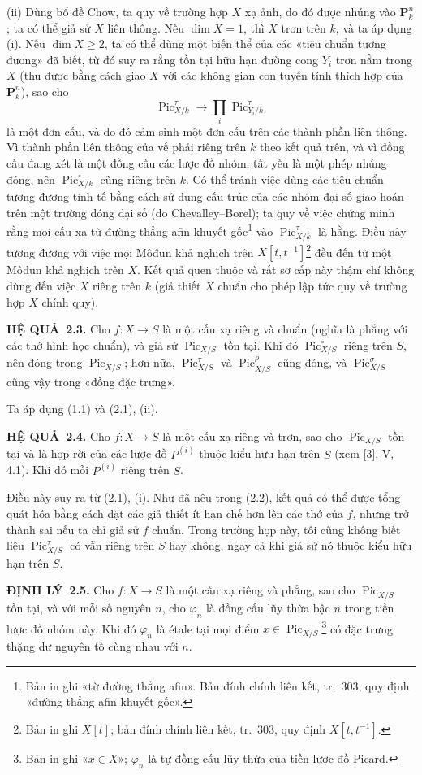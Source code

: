 \documentclass[11pt,twoside,openany]{book}
\numberwithin{equation}{section}
\newcommand{\src}[1]{%
  \phantomsection\hypertarget{src:\fgasourceid:#1}{}%
  \marginpar{\raggedleft\footnotesize\sffamily #1}%
}
\newcommand{\fgasourceid}{unset}
\newcommand{\result}[2]{\par\medskip\noindent\textbf{#1\if\relax\detokenize{#2}\relax\else\ #2\fi.}\quad}
\begin{document}
(ii) Dùng bổ đề Chow, ta quy về trường hợp $X$ xạ ảnh, do đó được nhúng vào
$\mathbf P_k^n$; ta có thể giả sử $X$ liên thông. Nếu $\dim X=1$, thì $X$ trơn
trên $k$, và ta áp dụng (i). Nếu $\dim X\geq2$, ta có thể dùng một biến thể của
các «tiêu chuẩn tương đương» đã biết, từ đó suy ra rằng tồn tại hữu hạn đường
cong $Y_i$ trơn nằm trong $X$ (thu được bằng cách giao $X$ với các không gian
con tuyến tính thích hợp của $\mathbf P_k^n$), sao cho
\[
\operatorname{Pic}_{X/k}^\tau\longrightarrow
\prod_i\operatorname{Pic}_{Y_i/k}^\tau
\]
là một đơn cấu, và do đó cảm sinh một đơn cấu trên các thành phần liên thông.
Vì thành phần liên thông của vế phải riêng trên $k$ theo kết quả trên, và vì
đồng cấu đang xét là một đồng cấu các lược đồ nhóm, tất yếu là một phép nhúng
đóng, nên $\operatorname{Pic}_{X/k}^\circ$ cũng riêng trên $k$. Có thể tránh
việc dùng các tiêu chuẩn tương đương tinh tế bằng cách sử dụng cấu trúc của các
nhóm đại số giao hoán trên một trường đóng đại số (do Chevalley--Borel); ta quy
về việc chứng minh rằng mọi cấu xạ từ đường thẳng afin khuyết
gốc\footnote{Bản in ghi «từ đường thẳng afin». Bản đính chính liên kết,
tr.~303, quy định «đường thẳng afin khuyết gốc».} vào
$\operatorname{Pic}_{X/k}^\tau$ là hằng. Điều này tương đương với việc mọi
Môđun khả nghịch trên $X[t,t^{-1}]$\footnote{Bản in ghi $X[t]$; bản đính
chính liên kết, tr.~303, quy định $X[t,t^{-1}]$.} đều đến từ một Môđun khả
nghịch trên $X$. Kết quả quen thuộc và rất sơ cấp này thậm chí không dùng đến
việc $X$ riêng trên $k$ (giả thiết $X$ chuẩn cho phép lập tức quy về trường hợp
$X$ chính quy).

\result{HỆ QUẢ}{2.3} Cho $f:X\longrightarrow S$ là một cấu xạ riêng và chuẩn
(nghĩa là phẳng với các thớ hình học chuẩn), và giả sử
$\operatorname{Pic}_{X/S}$ tồn tại. Khi đó $\operatorname{Pic}_{X/S}^\circ$
riêng trên $S$, nên đóng trong $\operatorname{Pic}_{X/S}$; hơn nữa,
$\operatorname{Pic}_{X/S}^\tau$ và $\operatorname{Pic}_{X/S}^\rho$ cũng đóng,
và $\operatorname{Pic}_{X/S}^\sigma$ cũng vậy trong «đồng đặc trưng».

Ta áp dụng (1.1) và (2.1), (ii).

\result{HỆ QUẢ}{2.4} Cho $f:X\longrightarrow S$ là một cấu xạ riêng và trơn,
sao cho $\operatorname{Pic}_{X/S}$ tồn tại và là hợp rời của các lược đồ
$P^{(i)}$ thuộc kiểu hữu hạn trên $S$ (xem [3], V, 4.1). Khi đó mỗi $P^{(i)}$
riêng trên $S$.

Điều này suy ra từ (2.1), (i). Như đã nêu trong (2.2), kết quả có thể được tổng
quát hóa bằng cách đặt các giả thiết ít hạn chế hơn lên các thớ của $f$, nhưng
trở thành sai nếu ta chỉ giả sử $f$ chuẩn. Trong trường hợp này, tôi cũng không
biết liệu $\operatorname{Pic}_{X/S}^\tau$ có vẫn riêng trên $S$ hay không,
ngay cả khi giả sử nó thuộc kiểu hữu hạn trên $S$.
\src{233}
\result{ĐỊNH LÝ}{2.5} Cho $f:X\longrightarrow S$ là một cấu xạ riêng và
phẳng, sao cho $\operatorname{Pic}_{X/S}$ tồn tại, và với mỗi số nguyên $n$,
cho $\varphi_n$ là đồng cấu lũy thừa bậc $n$ trong tiền lược đồ nhóm này. Khi
đó $\varphi_n$ là étale tại mọi điểm
$x\in\operatorname{Pic}_{X/S}$\footnote{Bản in ghi «$x\in X$»;
$\varphi_n$ là tự đồng cấu lũy thừa của tiền lược đồ Picard.} có đặc trưng
thặng dư nguyên tố cùng nhau với $n$.
\end{document}
